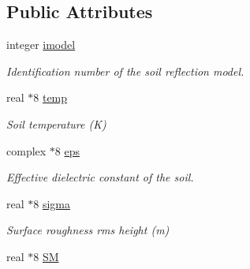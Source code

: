 \subsection*{Public Attributes}
\begin{DoxyCompactItemize}
\item 
\hypertarget{typemod__soil_1_1soilparams_a1cbd383e6abcd402112b908834a987fe}{
integer \hyperlink{typemod__soil_1_1soilparams_a1cbd383e6abcd402112b908834a987fe}{imodel}}
\label{typemod__soil_1_1soilparams_a1cbd383e6abcd402112b908834a987fe}

\begin{DoxyCompactList}\small\item\em Identification number of the soil reflection model. \end{DoxyCompactList}\item 
\hypertarget{typemod__soil_1_1soilparams_a495717dffe3333dc42980844fd5dcc76}{
real $\ast$8 \hyperlink{typemod__soil_1_1soilparams_a495717dffe3333dc42980844fd5dcc76}{temp}}
\label{typemod__soil_1_1soilparams_a495717dffe3333dc42980844fd5dcc76}

\begin{DoxyCompactList}\small\item\em Soil temperature (K) \end{DoxyCompactList}\item 
\hypertarget{typemod__soil_1_1soilparams_a64281c4db0ced4f7236f7a04c6001e5b}{
complex $\ast$8 \hyperlink{typemod__soil_1_1soilparams_a64281c4db0ced4f7236f7a04c6001e5b}{eps}}
\label{typemod__soil_1_1soilparams_a64281c4db0ced4f7236f7a04c6001e5b}

\begin{DoxyCompactList}\small\item\em Effective dielectric constant of the soil. \end{DoxyCompactList}\item 
\hypertarget{typemod__soil_1_1soilparams_a30179d18e569c2e2a74dea770ec78cb6}{
real $\ast$8 \hyperlink{typemod__soil_1_1soilparams_a30179d18e569c2e2a74dea770ec78cb6}{sigma}}
\label{typemod__soil_1_1soilparams_a30179d18e569c2e2a74dea770ec78cb6}

\begin{DoxyCompactList}\small\item\em Surface roughness rms height (m) \end{DoxyCompactList}\item 
\hypertarget{typemod__soil_1_1soilparams_acbf1724e8b2c386ef99811131a1f7a27}{
real $\ast$8 \hyperlink{typemod__soil_1_1soilparams_acbf1724e8b2c386ef99811131a1f7a27}{SM}}
\label{typemod__soil_1_1soilparams_acbf1724e8b2c386ef99811131a1f7a27}


\end{DoxyCompactItemize}
